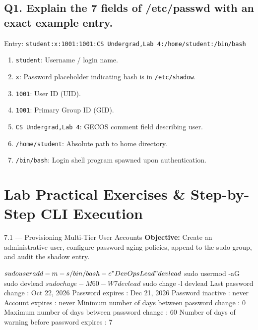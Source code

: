 \subsection*{Q1. Explain the 7 fields of /etc/passwd with an exact example entry.}
\begin{vivasol}
Entry: \texttt{student:x:1001:1001:CS Undergrad,Lab 4:/home/student:/bin/bash}
\begin{enumerate}[leftmargin=1.5em]
    \item \texttt{student}: Username / login name.
    \item \texttt{x}: Password placeholder indicating hash is in \texttt{/etc/shadow}.
    \item \texttt{1001}: User ID (UID).
    \item \texttt{1001}: Primary Group ID (GID).
    \item \texttt{CS Undergrad,Lab 4}: GECOS comment field describing user.
    \item \texttt{/home/student}: Absolute path to home directory.
    \item \texttt{/bin/bash}: Login shell program spawned upon authentication.
\end{enumerate}
\end{vivasol}

\section{Lab Practical Exercises \& Step-by-Step CLI Execution}

\begin{practicalbox}{7.1 --- Provisioning Multi-Tier User Accounts}
\textbf{Objective:} Create an administrative user, configure password aging policies, append to the sudo group, and audit the shadow entry.
\begin{clibox}
$ sudo useradd -m -s /bin/bash -c "DevOps Lead" devlead
$ sudo usermod -aG sudo devlead
$ sudo chage -M 60 -W 7 devlead
$ sudo chage -l devlead
Last password change                                    : Oct 22, 2026
Password expires                                        : Dec 21, 2026
Password inactive                                       : never
Account expires                                         : never
Minimum number of days between password change          : 0
Maximum number of days between password change          : 60
Number of days of warning before password expires       : 7
\end{clibox}
\end{practicalbox}
